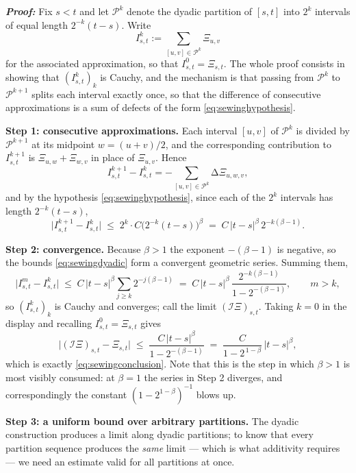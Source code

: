\textbf{\textit{Proof:}} Fix $s<t$ and let $\mathcal{P}^{k}$ denote the dyadic partition of $[s,t]$
into $2^{k}$ intervals of equal length $2^{-k}(t-s)$. Write
\[
I^{k}_{s,t} := \sum_{[u,v]\in\mathcal{P}^k} \Xi_{u,v}
\]
for the associated approximation, so that $I^0_{s,t} = \Xi_{s,t}$. The whole proof consists in
showing that $(I^k_{s,t})_k$ is Cauchy, and the mechanism is that passing from $\mathcal{P}^k$ to
$\mathcal{P}^{k+1}$ splits each interval exactly once, so that the difference of consecutive
approximations is a sum of defects of the form \eqref{eq:sewinghypothesis}.

\medskip
\noindent\textbf{Step 1: consecutive approximations.} Each interval $[u,v]$ of $\mathcal{P}^k$ is
divided by $\mathcal{P}^{k+1}$ at its midpoint $w = (u+v)/2$, and the corresponding contribution to
$I^{k+1}_{s,t}$ is $\Xi_{u,w}+\Xi_{w,v}$ in place of $\Xi_{u,v}$. Hence
\[
I^{k+1}_{s,t} - I^{k}_{s,t} = -\sum_{[u,v]\in\mathcal{P}^{k}} \increment{\Xi}_{u,w,v},
\]
and by the hypothesis \eqref{eq:sewinghypothesis}, since each of the $2^k$ intervals has length
$2^{-k}(t-s)$,
\begin{equation}\label{eq:sewingdyadic}
\bigl| I^{k+1}_{s,t} - I^{k}_{s,t} \bigr| \;\leq\; 2^{k}\cdot C\bigl(2^{-k}(t-s)\bigr)^{\beta}
\;=\; C\,|t-s|^{\beta}\,2^{-k(\beta-1)} .
\end{equation}

\medskip
\noindent\textbf{Step 2: convergence.} Because $\beta>1$ the exponent $-(\beta-1)$ is negative, so
the bounds \eqref{eq:sewingdyadic} form a convergent geometric series. Summing them,
\[
\bigl| I^{m}_{s,t} - I^{k}_{s,t} \bigr| \;\leq\; C\,|t-s|^{\beta}\sum_{j\geq k} 2^{-j(\beta-1)}
\;=\; C\,|t-s|^{\beta}\,\frac{2^{-k(\beta-1)}}{1-2^{-(\beta-1)}}, \qquad m>k,
\]
so $(I^k_{s,t})_k$ is Cauchy and converges; call the limit $(\mathcal{I}\Xi)_{s,t}$. Taking $k=0$ in
the display and recalling $I^0_{s,t}=\Xi_{s,t}$ gives
\[
\bigl| (\mathcal{I}\Xi)_{s,t} - \Xi_{s,t}\bigr| \;\leq\; \frac{C\,|t-s|^{\beta}}{1 - 2^{-(\beta-1)}}
\;=\; \frac{C}{1-2^{\,1-\beta}}\,|t-s|^{\beta},
\]
which is exactly \eqref{eq:sewingconclusion}. Note that this is the step in which $\beta>1$ is most
visibly consumed: at $\beta=1$ the series in Step 2 diverges, and correspondingly the constant
$(1-2^{1-\beta})^{-1}$ blows up.

\medskip

\noindent\textbf{Step 3: a uniform bound over arbitrary partitions.} The dyadic construction
produces a limit along dyadic partitions; to know that every partition sequence produces the
\emph{same} limit --- which is what additivity requires --- we need an estimate valid for all
partitions at once.

